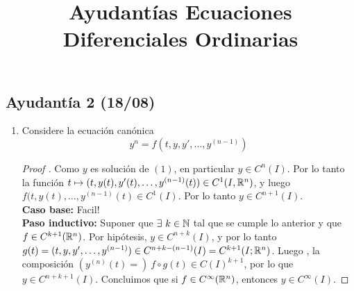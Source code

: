 \documentclass[a4paper]{report}
\title{Ayudantías Ecuaciones Diferenciales Ordinarias}
\author{}
\begin{document}
    \maketitle
    \tableofcontents

    \chapter{}
    \setcounter{section}{0}
	\section{Ayudantía 2 (18/08)}

	\begin{enumerate}
		\item Considere la ecuación canónica
		\[
		y^{n} = f(t,y,y',\dots,y^{(n-1)}) \tag{1}
		\]
		\begin{proof}[Proof ]
			Como $y$ es solución de $(1)$, en particular $y \in C^n(I)$. Por lo tanto la función $t \mapsto (t,y(t),y'(t),\dots,y^{(n-1)}(t)) \in C^1 (I,\mathbb{R}^n)$, y luego  $f(t,y(t),\dots, y^{(n-1)}(t) \in C^1(I)$. Por lo tanto $y \in C^{n+1}(I)$. \\
			\noindent {} \textbf{Caso base:} Facil! \\
			\noindent \textbf{Paso inductivo:} Suponer que $\exists\ k \in \mathbb{N}$ tal que se cumple lo anterior y que $f \in C^{k+1}(\mathbb{R}^n)$. Por hipótesis, $y \in C^{n+k}(I)$, y por lo tanto $g(t) = (t,y,y',\dots,y^{(n-1)}) \in C^{n+k-(n-1)}(I) = C^{k+1}(I;\mathbb{R}^n)$. Luego , la composición $(y^{(n)}(t) =)\ f \circ g (t) \in C(I)^{k+1}$, por lo que $y \in C^{n+k+1}(I)$. Concluimos que si $f \in C^{\infty}(\mathbb{R}^n)$, entonces $y \in C^{\infty}(I)$.
		\end{proof}


\end{enumerate}
\end{document}
